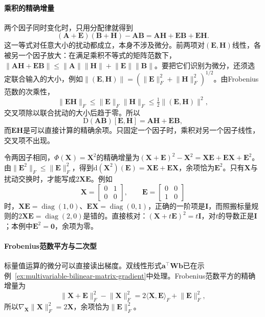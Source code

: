 \paragraph{乘积的精确增量}
两个因子同时变化时，只用分配律就得到
\begin{equation}
 (\bm A+\bm E)(\bm B+\bm H)-\bm A\bm B=\bm A\bm H+\bm E\bm B+\bm E\bm H .
\label{eq:multivariable-product-increment}
\end{equation}
这一等式对任意大小的扰动都成立，本身不涉及微分。前两项对$(\bm E,\bm H)$线性，各被另一个因子放大：在满足乘积不等式的矩阵范数下，$\lVert\bm A\bm H+\bm E\bm B\rVert\leq\lVert\bm A\rVert\lVert\bm H\rVert+\lVert\bm E\rVert\lVert\bm B\rVert$。要把它们识别为微分，还须选定联合输入的大小，例如$\lVert(\bm E,\bm H)\rVert=(\lVert\bm E\rVert_F^2+\lVert\bm H\rVert_F^2)^{1/2}$。由Frobenius范数的次乘性，
\[
 \lVert\bm E\bm H\rVert_F\leq\lVert\bm E\rVert_F\lVert\bm H\rVert_F\leq\tfrac12\lVert(\bm E,\bm H)\rVert^2 ,
\]
交叉项除以联合扰动的大小后趋于零。所以
\[
 \mathrm D(\bm A\bm B)[\bm E,\bm H]=\bm A\bm H+\bm E\bm B,
\]
而$\bm E\bm H$是可以直接计算的精确余项。只固定一个因子时，乘积对另一个因子线性，交叉项不出现。

令两因子相同，$\Phi(\bm X)=\bm X^2$的精确增量为$(\bm X+\bm E)^2-\bm X^2=\bm X\bm E+\bm E\bm X+\bm E^2$。由$\lVert\bm E^2\rVert_F\leq\lVert\bm E\rVert_F^2$，得到$\mathrm d(\bm X^2)(\bm E)=\bm X\bm E+\bm E\bm X$，余项恰为$\bm E^2$。只有$\bm X$与扰动交换时，才能写成$2\bm X\bm E$。例如
\[
 \bm X=\begin{bmatrix}0&1\\0&0\end{bmatrix},\qquad
 \bm E=\begin{bmatrix}0&0\\1&0\end{bmatrix}
\]
时，$\bm X\bm E=\operatorname{diag}(1,0)$、$\bm E\bm X=\operatorname{diag}(0,1)$，正确的一阶项是$\bm I$，而照搬标量规则的$2\bm X\bm E=\operatorname{diag}(2,0)$是错的。直接核对：$(\bm X+t\bm E)^2=t\bm I$，对$t$的导数正是$\bm I$；本例中$\bm E^2=\bm 0$，余项为零。

\paragraph{Frobenius范数平方与二次型}
标量值运算的微分可以直接读出梯度。双线性形式$\bm a^\top\bm W\bm b$已在示例~\ref{ex:multivariable-bilinear-matrix-gradient}中处理。Frobenius范数平方的精确增量为
\[
 \lVert\bm X+\bm E\rVert_F^2-\lVert\bm X\rVert_F^2=2\langle\bm X,\bm E\rangle_F+\lVert\bm E\rVert_F^2 ,
\]
所以$\nabla_{\bm X}\lVert\bm X\rVert_F^2=2\bm X$，余项恰为$\lVert\bm E\rVert_F^2$。

